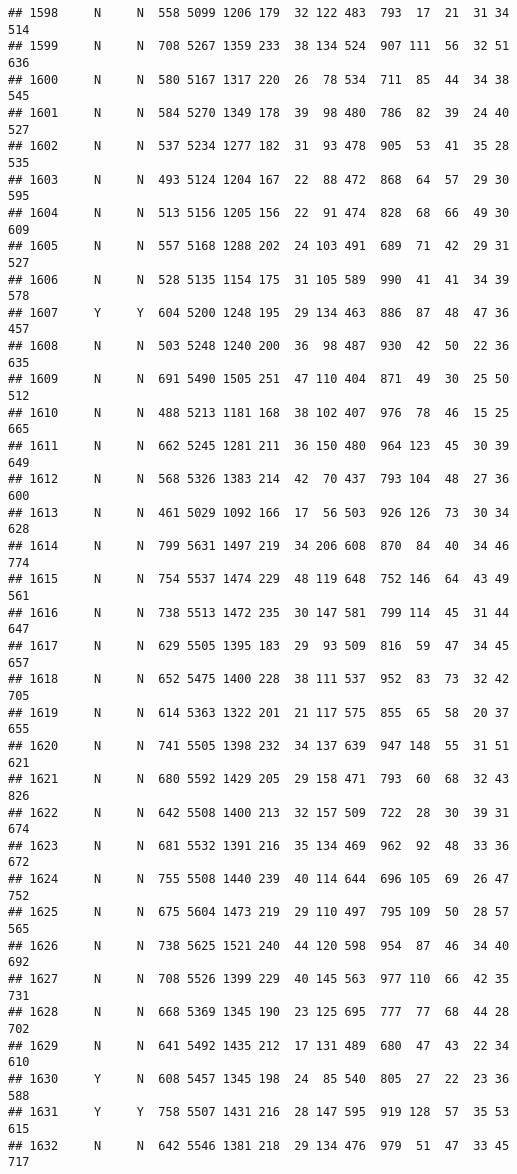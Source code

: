 \documentclass[]{article}
\begin{document}
\begin{verbatim}
## 1598     N     N  558 5099 1206 179  32 122 483  793  17  21  31 34  514
## 1599     N     N  708 5267 1359 233  38 134 524  907 111  56  32 51  636
## 1600     N     N  580 5167 1317 220  26  78 534  711  85  44  34 38  545
## 1601     N     N  584 5270 1349 178  39  98 480  786  82  39  24 40  527
## 1602     N     N  537 5234 1277 182  31  93 478  905  53  41  35 28  535
## 1603     N     N  493 5124 1204 167  22  88 472  868  64  57  29 30  595
## 1604     N     N  513 5156 1205 156  22  91 474  828  68  66  49 30  609
## 1605     N     N  557 5168 1288 202  24 103 491  689  71  42  29 31  527
## 1606     N     N  528 5135 1154 175  31 105 589  990  41  41  34 39  578
## 1607     Y     Y  604 5200 1248 195  29 134 463  886  87  48  47 36  457
## 1608     N     N  503 5248 1240 200  36  98 487  930  42  50  22 36  635
## 1609     N     N  691 5490 1505 251  47 110 404  871  49  30  25 50  512
## 1610     N     N  488 5213 1181 168  38 102 407  976  78  46  15 25  665
## 1611     N     N  662 5245 1281 211  36 150 480  964 123  45  30 39  649
## 1612     N     N  568 5326 1383 214  42  70 437  793 104  48  27 36  600
## 1613     N     N  461 5029 1092 166  17  56 503  926 126  73  30 34  628
## 1614     N     N  799 5631 1497 219  34 206 608  870  84  40  34 46  774
## 1615     N     N  754 5537 1474 229  48 119 648  752 146  64  43 49  561
## 1616     N     N  738 5513 1472 235  30 147 581  799 114  45  31 44  647
## 1617     N     N  629 5505 1395 183  29  93 509  816  59  47  34 45  657
## 1618     N     N  652 5475 1400 228  38 111 537  952  83  73  32 42  705
## 1619     N     N  614 5363 1322 201  21 117 575  855  65  58  20 37  655
## 1620     N     N  741 5505 1398 232  34 137 639  947 148  55  31 51  621
## 1621     N     N  680 5592 1429 205  29 158 471  793  60  68  32 43  826
## 1622     N     N  642 5508 1400 213  32 157 509  722  28  30  39 31  674
## 1623     N     N  681 5532 1391 216  35 134 469  962  92  48  33 36  672
## 1624     N     N  755 5508 1440 239  40 114 644  696 105  69  26 47  752
## 1625     N     N  675 5604 1473 219  29 110 497  795 109  50  28 57  565
## 1626     N     N  738 5625 1521 240  44 120 598  954  87  46  34 40  692
## 1627     N     N  708 5526 1399 229  40 145 563  977 110  66  42 35  731
## 1628     N     N  668 5369 1345 190  23 125 695  777  77  68  44 28  702
## 1629     N     N  641 5492 1435 212  17 131 489  680  47  43  22 34  610
## 1630     Y     N  608 5457 1345 198  24  85 540  805  27  22  23 36  588
## 1631     Y     Y  758 5507 1431 216  28 147 595  919 128  57  35 53  615
## 1632     N     N  642 5546 1381 218  29 134 476  979  51  47  33 45  717

\end{verbatim}
\end{document}
